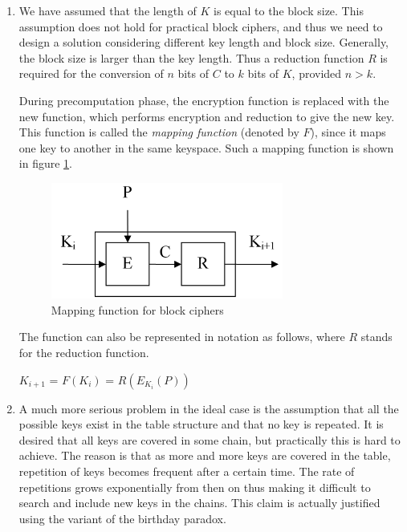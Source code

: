 \begin{enumerate}

\item We have assumed that the length of $K$ is equal to the block size. This assumption does not hold for practical block ciphers, and thus we need to design a solution considering different key length and block size. Generally, the block size is larger than the key length. Thus a reduction function $R$ is required for the conversion of $n$ bits of $C$ to $k$ bits of $K$, provided $n > k$. 


During precomputation phase, the encryption function is replaced with the new function, which performs encryption and reduction to give the new key. This function is called the \emph{mapping function} (denoted by $F$), since it maps one key to another in the same keyspace. Such a mapping function is shown in figure \ref{fig:mapping-function}. 

\begin{figure}[ht!]
	\centering
		\includegraphics[width=3in]{./figures/mapping-function.PNG}
	\caption{Mapping function for block ciphers}	
	\label{fig:mapping-function}
\end{figure}

The function can also be represented in notation as follows, where $R$ stands for the reduction function.

\begin{center}
$K_{i+1}$ = $F(K_i)$ = $R(E_{K_i}(P))$\\
\end{center}

\item A much more serious problem in the ideal case is the assumption that all the possible keys exist in the table structure and that no key is repeated. It is desired that all keys are covered in some chain, but practically this is hard to achieve. The reason is that as more and more keys are covered in the table, repetition of keys becomes frequent after a certain time. The rate of repetitions grows exponentially from then on thus making it difficult to search and include new keys in the chains. This claim is actually justified using the variant of the birthday paradox.


\end{enumerate}
